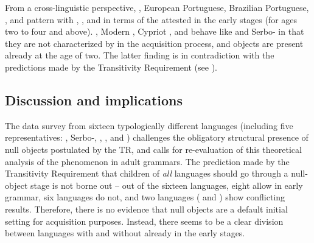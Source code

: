 \documentclass[output=paper,modfonts,newtxmath,hidelinks,]{langscibook}
\begin{document}
From a cross-linguistic perspective, 
, 
European Portuguese, Brazilian Por\-tu\-guese, 
, and  pattern with , , and  in terms of the attested  in the early stages (for ages two to four and above). , Modern , Cypriot , and  behave like  and Serbo- in that they are not characterized by  in the acquisition process, and objects are present already at the age of two. The latter finding is in contradiction with the predictions made by the Transitivity Requirement (see ).

\subsection{Discussion and implications}\label{17:sec:key:3.3}

The data survey from sixteen typologically different languages (including five  representatives: , Serbo-, , , and ) challenges the obligatory structural presence of null objects postulated by the TR, and calls for re-evaluation of this theoretical analysis of the  phenomenon in adult grammars. The prediction made by the Transitivity Requirement that children of \textit{all} languages should go through a null-object stage is not borne out -- out of the sixteen languages, eight allow  in early grammar, six languages do not, and two languages ( and ) show conflicting results. Therefore, there is no evidence that null objects are a default initial setting for acquisition purposes. Instead, there seems to be a clear division between languages with and without  already in the early stages.
\end{document}

